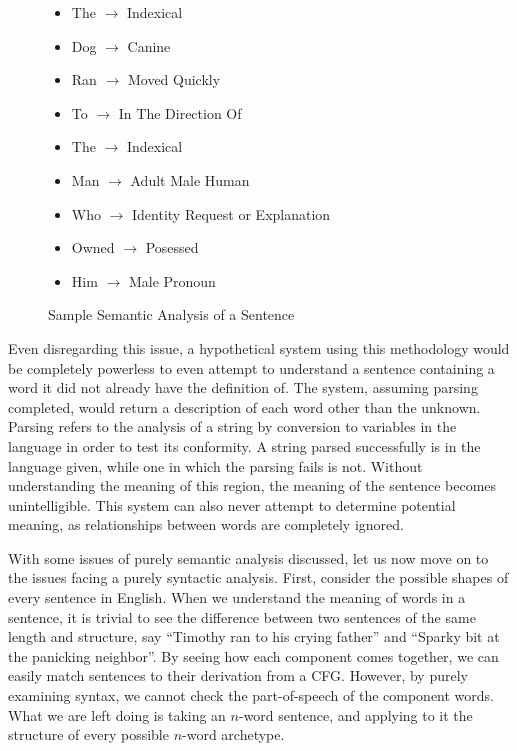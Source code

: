 \begin{center}
\begin{figure}[H]
\begin{center}

\begin{itemize}

	\item The $\rightarrow$ Indexical 
	\item Dog $\rightarrow$ Canine
	\item Ran $\rightarrow$ Moved Quickly
	\item To $\rightarrow$ In The Direction Of
	\item The $\rightarrow$ Indexical
	\item Man $\rightarrow$ Adult Male Human
	\item Who $\rightarrow$ Identity Request or Explanation
	\item Owned $\rightarrow$ Posessed
	\item Him $\rightarrow$ Male Pronoun

\end{itemize}
\end{center}
\caption{Sample Semantic Analysis of a Sentence}
\end{figure}
\end{center}

Even disregarding this issue, a hypothetical system using this methodology would be completely powerless to even attempt to understand a sentence containing a word it did not already have the definition of. The system, assuming parsing completed, would return a description of each word other than the unknown. Parsing refers to the analysis of a string by conversion to variables in the language in order to test its conformity. A string parsed successfully is in the language given, while one in which the parsing fails is not. Without understanding the meaning of this region, the meaning of the sentence becomes unintelligible. This system can also never attempt to determine potential meaning, as relationships between words are completely ignored.

With some issues of purely semantic analysis discussed, let us now move on to the issues facing a purely syntactic analysis. First, consider the possible shapes of every sentence in English. When we understand the meaning of words in a sentence, it is trivial to see the difference between two sentences of the same length and structure, say ``Timothy ran to his crying father'' and ``Sparky bit at the panicking neighbor''. By seeing how each component comes together, we can easily match sentences to their derivation from a CFG. However, by purely examining syntax, we cannot check the part-of-speech of the component words. What we are left doing is taking an $n$-word sentence, and applying to it the structure of every possible $n$-word archetype.

